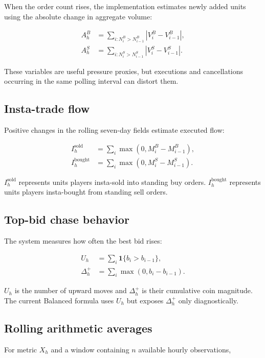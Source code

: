 \documentclass[11pt,a4paper]{article}
\begin{document}
When the order count rises, the implementation estimates newly added units using the absolute
change in aggregate volume:

\begin{align}
A_h^B &= \sum_{i:N_i^B>N_{i-1}^B}\left|V_i^B-V_{i-1}^B\right|,\\
A_h^S &= \sum_{i:N_i^S>N_{i-1}^S}\left|V_i^S-V_{i-1}^S\right|.
\end{align}

These variables are useful pressure proxies, but executions and cancellations occurring in
the same polling interval can distort them.

\subsection{Insta-trade flow}

Positive changes in the rolling seven-day fields estimate executed flow:

\begin{align}
I_h^{\mathrm{sold}} &= \sum_i \max(0,M_i^B-M_{i-1}^B),\\
I_h^{\mathrm{bought}} &= \sum_i \max(0,M_i^S-M_{i-1}^S).
\end{align}

$I_h^{\mathrm{sold}}$ represents units players insta-sold into standing buy orders.
$I_h^{\mathrm{bought}}$ represents units players insta-bought from standing sell orders.

\subsection{Top-bid chase behavior}

The system measures how often the best bid rises:

\begin{align}
U_h &= \sum_i \mathbf{1}\{b_i>b_{i-1}\},\\
\Delta_h^+ &= \sum_i \max(0,b_i-b_{i-1}).
\end{align}

$U_h$ is the number of upward moves and $\Delta_h^+$ is their cumulative coin magnitude.
The current Balanced formula uses $U_h$ but exposes $\Delta_h^+$ only diagnostically.

\subsection{Rolling arithmetic averages}

For metric $X_h$ and a window containing $n$ available hourly observations,
\end{document}
